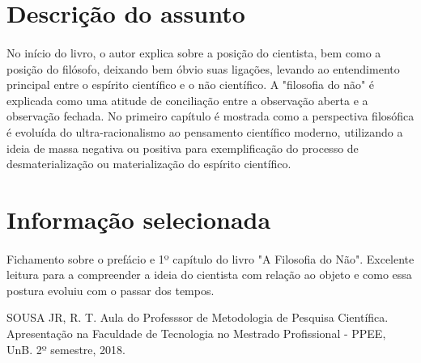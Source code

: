 \documentclass[11pt]{article}
\begin{document}
\section{Descrição do assunto}
\paragraph{}
    No início do livro, o autor explica sobre a posição do cientista, bem como a posição do filósofo, deixando bem óbvio suas ligações, levando ao entendimento principal entre o espírito científico e o não científico. A "filosofia do não" é explicada como uma atitude de conciliação entre a observação aberta e a observação fechada. No primeiro capítulo é mostrada como a perspectiva filosófica é evoluída do ultra-racionalismo ao pensamento científico moderno, utilizando a ideia de massa negativa ou positiva para exemplificação do processo de desmaterialização ou materialização do espírito científico.

\section{Informação selecionada}
\paragraph{}
    Fichamento sobre o prefácio e 1º capítulo do livro "A Filosofia do Não".
    Excelente leitura para a compreender a ideia do cientista com relação ao objeto e como essa postura evoluiu com o passar dos tempos.




	SOUSA JR, R. T. Aula do Professsor de Metodologia de Pesquisa Científica. Apresentação na Faculdade de Tecnologia no Mestrado Profissional - PPEE, UnB. 2º semestre, 2018. 
\end{document}
